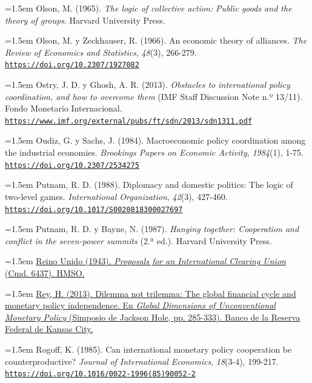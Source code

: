 \documentclass[10pt,a4paper]{article}
\begin{document}
\noindent\hangindent=1.5em Olson, M. (1965). \textit{The logic of collective action: Public goods and the theory of groups}. Harvard University Press.

\noindent\hangindent=1.5em Olson, M. y Zeckhauser, R. (1966). An economic theory of alliances. \textit{The Review of Economics and Statistics}, \textit{48}(3), 266-279. \href{https://doi.org/10.2307/1927082}{\nolinkurl{https://doi.org/10.2307/1927082}}

\noindent\hangindent=1.5em Ostry, J. D. y Ghosh, A. R. (2013). \textit{Obstacles to international policy coordination, and how to overcome them} (IMF Staff Discussion Note n.º 13/11). Fondo Monetario Internacional. \href{https://www.imf.org/external/pubs/ft/sdn/2013/sdn1311.pdf}{\nolinkurl{https://www.imf.org/external/pubs/ft/sdn/2013/sdn1311.pdf}}

\noindent\hangindent=1.5em Oudiz, G. y Sachs, J. (1984). Macroeconomic policy coordination among the industrial economies. \textit{Brookings Papers on Economic Activity}, \textit{1984}(1), 1-75. \href{https://doi.org/10.2307/2534275}{\nolinkurl{https://doi.org/10.2307/2534275}}

\noindent\hangindent=1.5em Putnam, R. D. (1988). Diplomacy and domestic politics: The logic of two-level games. \textit{International Organization}, \textit{42}(3), 427-460. \href{https://doi.org/10.1017/S0020818300027697}{\nolinkurl{https://doi.org/10.1017/S0020818300027697}}

\noindent\hangindent=1.5em Putnam, R. D. y Bayne, N. (1987). \textit{Hanging together: Cooperation and conflict in the seven-power summits} (2.ª ed.). Harvard University Press.

\noindent\hangindent=1.5em \href{https://api.parliament.uk/historic-hansard/lords/1943/may/18/international-clearing-union}{Reino Unido (1943). \textit{Proposals for an International Clearing Union} (Cmd. 6437). HMSO.}

\noindent\hangindent=1.5em \href{https://www.kansascityfed.org/Jackson\%20Hole/documents/4575/2013Rey.pdf}{Rey, H. (2013). Dilemma not trilemma: The global financial cycle and monetary policy independence. En \textit{Global Dimensions of Unconventional Monetary Policy} (Simposio de Jackson Hole, pp. 285-333). Banco de la Reserva Federal de Kansas City.}

\noindent\hangindent=1.5em Rogoff, K. (1985). Can international monetary policy cooperation be counterproductive? \textit{Journal of International Economics}, \textit{18}(3-4), 199-217. \href{https://doi.org/10.1016/0022-1996(85)90052-2}{\nolinkurl{https://doi.org/10.1016/0022-1996(85)90052-2}}
\end{document}
